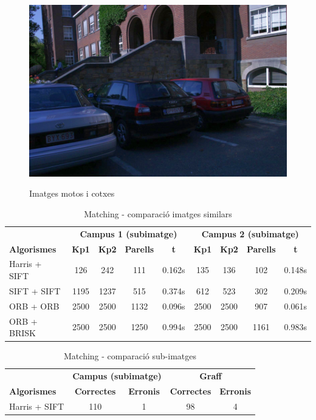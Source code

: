 \begin{figure}[!htb]
				\label{fig:awesome_image3}
			\endminipage\hfill
				\includegraphics[width=\linewidth]{images/experiments/cars6}
				\label{fig:awesome_image3}
			\endminipage
			\caption{Imatges motos i cotxes}
		\end{figure}

		\begin{table}[H]
			\begin{center}
				\begin{tabular}{l | c c c c | c c c c}
					& \multicolumn{4}{c|}{\textbf{Campus 1 (subimatge)}} & \multicolumn{4}{c}{\textbf{Campus 2 (subimatge)}} \\
					\textbf{Algorismes} & \textbf{Kp1} & \textbf{Kp2} & \textbf{Parells} & \textbf{t} & \textbf{Kp1} & \textbf{Kp2} & \textbf{Parells} & \textbf{t} \\ \hline
					Harris + SIFT & 126 & 242 & 111 & 0.162s & 135 & 136 & 102 & 0.148s \\
					SIFT + SIFT & 1195 & 1237 & 515 & 0.374s & 612 & 523 & 302 & 0.209s \\
					ORB + ORB & 2500 & 2500 & 1132 & 0.096s & 2500 & 2500 & 907 & 0.061s \\
					ORB + BRISK & 2500 & 2500 & 1250 & 0.994s & 2500 & 2500 & 1161 & 0.983s \\
				\end{tabular}
			\end{center}
			\caption{Matching - comparació imatges similars}
		\end{table}

		\begin{table}[H]
			\begin{center}
				\begin{tabular}{l | c c | c c}
					& \multicolumn{2}{c|}{\textbf{Campus (subimatge)}} & \multicolumn{2}{c}{\textbf{Graff}} \\
					\textbf{Algorismes} & \textbf{Correctes} & \textbf{Erronis} & \textbf{Correctes} & \textbf{Erronis} \\ \hline
					Harris + SIFT & 110 & 1 & 98 & 4 \\
				\end{tabular}
			\end{center}
			\caption{Matching - comparació sub-imatges}
		\end{table}

